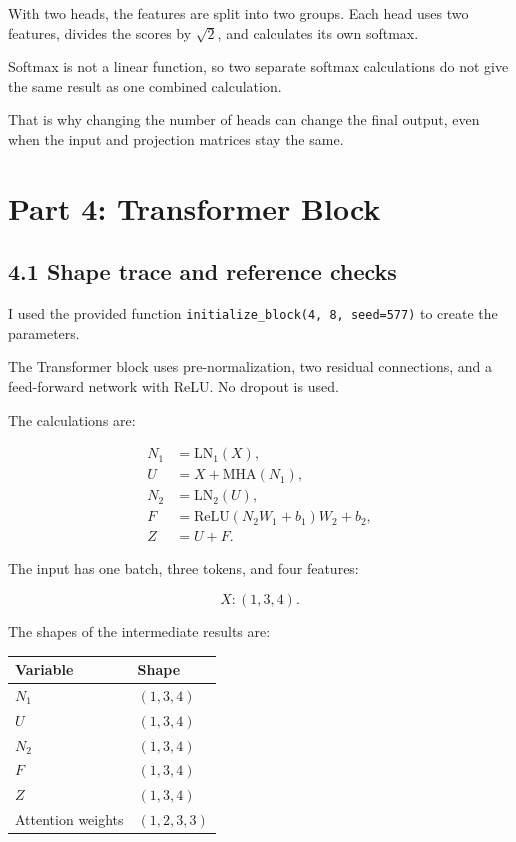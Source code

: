 \documentclass[11pt]{article}
\begin{document}
With two heads, the features are split into two
groups. Each head uses two features, divides
the scores by $\sqrt{2}$, and calculates its own
softmax.

Softmax is not a linear function, so two separate
softmax calculations do not give the same result
as one combined calculation.

That is why changing the number of heads can
change the final output, even when the input
and projection matrices stay the same.
\section*{Part 4: Transformer Block}
\subsection*{4.1 Shape trace and reference checks}
I used the provided function
\texttt{initialize\_block(4, 8, seed=577)}
to create the parameters.

The Transformer block uses pre-normalization,
two residual connections, and a feed-forward
network with ReLU. No dropout is used.

The calculations are:

\[
\begin{aligned}
N_1 &= \mathrm{LN}_1(X),\\
U &= X+\mathrm{MHA}(N_1),\\
N_2 &= \mathrm{LN}_2(U),\\
F &= \mathrm{ReLU}(N_2W_1+b_1)W_2+b_2,\\
Z &= U+F.
\end{aligned}
\]

The input has one batch, three tokens, and
four features:

\[
X:(1,3,4).
\]

The shapes of the intermediate results are:

\begin{center}
\begin{tabular}{ll}
\toprule
Variable & Shape \\
\midrule
$N_1$ & $(1,3,4)$ \\
$U$ & $(1,3,4)$ \\
$N_2$ & $(1,3,4)$ \\
$F$ & $(1,3,4)$ \\
$Z$ & $(1,3,4)$ \\
Attention weights & $(1,2,3,3)$ \\
\bottomrule
\end{tabular}
\end{center}
\end{document}
